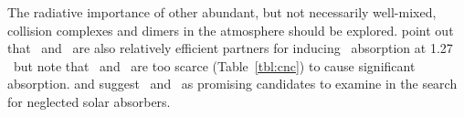 \documentclass[agupp,twoside]{aguplus} %
\begin{document}


The radiative importance of other abundant, but not necessarily
well-mixed, collision complexes and dimers in the atmosphere should be  
explored.    
\cite{SPS98} point out that \Ar\ and \COd\ are also relatively
efficient partners for inducing \Od\ absorption at 1.27\,\um\ but note
that \OdAr\ and \OdCOd\ are too scarce (Table~\ref{tbl:cnc}) to cause
significant absorption.
\cite{ChG97} and \cite{SPS98} suggest \OdHdO\ and \HdOHdO\ as
promising candidates to examine in the search for neglected solar
absorbers.   
\end{document}
